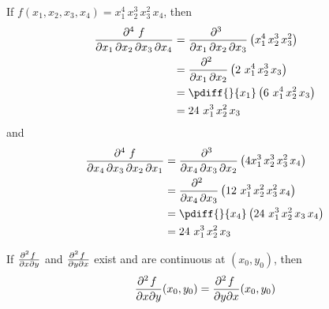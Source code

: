 \begin{eg}\label{eg higher order C}
If $f(x_1,x_2,x_3,x_4) = x_1^4\, x_2^3\, x_3^2\, x_4$, then
\begin{align*}
\frac{\partial^4\  f}
{\partial x_1\, \partial x_2\,\partial x_3\,\partial x_4}
&=  \frac{\partial^3 \ }
{\partial x_1\, \partial x_2\,\partial x_3}
\left( x_1^4\, x_2^3\, x_3^2\right)  \\
&=  \frac{\partial^2 \ }
{\partial x_1\, \partial x_2}
\left( 2\ x_1^4\, x_2^3\, x_3\right)  \\
&=  \pdiff{}{x_1}
\left( 6\ x_1^4\, x_2^2\, x_3\right)  \\
&=   24\ x_1^3\, x_2^2\, x_3
\end{align*}
and
\begin{align*}
\frac{\partial^4\ f}
{\partial x_4\, \partial x_3\,\partial x_2\,\partial x_1}
&=  \frac{\partial^3 \ }
{\partial x_4\, \partial x_3\,\partial x_2}
\left( 4 x_1^3\, x_2^3\, x_3^2\,x_4\right)  \\
&=  \frac{\partial^2 \ }
{\partial x_4\, \partial x_3}
\left( 12\ x_1^3\, x_2^2\, x_3^2\,x_4\right)  \\
&=  \pdiff{}{x_4}
\left( 24\ x_1^3\, x_2^2\, x_3\,x_4\right)  \\
&=   24\ x_1^3\, x_2^2\, x_3
\end{align*}
\end{eg}
\begin{theorem}
If %
$\frac{\partial^2\hfil f\hfil\,}{\partial x\partial y}$ and
$\frac{\partial^2\hfil f\hfil\,}{\partial y\partial x}$ exist
and are continuous at $(x_0,y_0)$, then
$$
\frac{\partial^2\hfil f\hfil\,}{\partial x\partial y}(x_0,y_0)
=\frac{\partial^2\hfil f\hfil\,}{\partial y\partial x}(x_0,y_0)
$$
\end{theorem}
